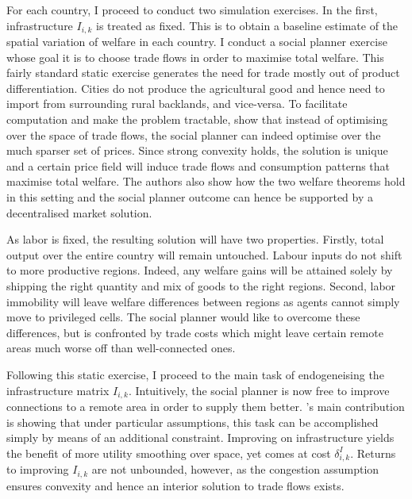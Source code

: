 \documentclass[11pt, oneside]{article}   	%
\begin{document}
For each country, I proceed to conduct two simulation exercises. In the first, infrastructure $I_{i,k}$ is treated as fixed. This is to obtain a baseline estimate of the spatial variation of welfare in each country. I conduct a social planner exercise whose goal it is to choose trade flows in order to maximise total welfare. This fairly standard static exercise generates the need for trade mostly out of product differentiation. Cities do not produce the agricultural good and hence need to import from surrounding rural backlands, and vice-versa. To facilitate computation and make the problem tractable, \citeauthor{fajgelbaum_optimal_2017} show that instead of optimising over the space of trade flows, the social planner can indeed optimise over the much sparser set of prices. Since strong convexity holds, the solution is unique and a certain price field will induce trade flows and consumption patterns that maximise total welfare. The authors also show how the two welfare theorems hold in this setting and the social planner outcome can hence be supported by a decentralised market solution.

As labor is fixed, the resulting solution will have two properties. Firstly, total output over the entire country will remain untouched. Labour inputs do not shift to more productive regions. Indeed, any welfare gains will be attained solely by shipping the right quantity and mix of goods to the right regions. Second, labor immobility will leave welfare differences between regions as agents cannot simply move to privileged cells. The social planner would like to overcome these differences, but is confronted by trade costs which might leave certain remote areas much worse off than well-connected ones.

Following this static exercise, I proceed to the main task of endogeneising the infrastructure matrix $I_{i,k}$. Intuitively, the social planner is now free to improve connections to a remote area in order to supply them better. \citeauthor{fajgelbaum_optimal_2017}'s main contribution is showing that under particular assumptions, this task can be accomplished simply by means of an additional constraint. Improving on infrastructure yields the benefit of more utility smoothing over space, yet comes at cost $\delta_{i,k}^{I}$. Returns to improving $I_{i,k}$ are not unbounded, however, as the congestion assumption ensures convexity and hence an interior solution to trade flows exists.
\end{document}
